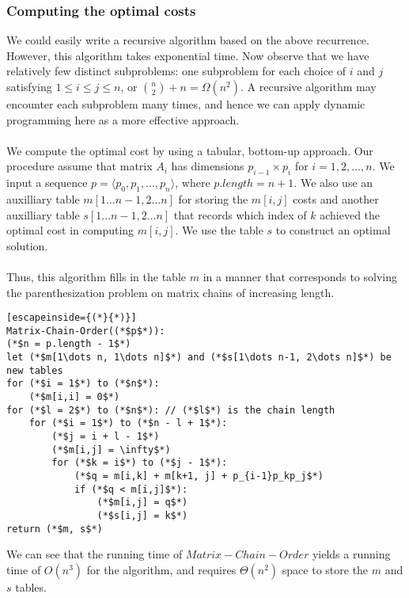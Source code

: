 \documentclass[a4paper]{article}
\begin{document}
\subsubsection{Computing the optimal costs}
We could easily write a recursive algorithm based on the above recurrence. However, this algorithm takes exponential time. Now observe that we have relatively few distinct subproblems: one subproblem for each choice of $i$ and $j$ satisfying $1\le i\le j \le n$, or ${n\choose2}+n =\Omega(n^2)$. A recursive algorithm may encounter each subproblem many times, and hence we can apply dynamic programming here as a more effective approach.\\\\
We compute the optimal cost by using a tabular, bottom-up approach. Our procedure assume that matrix $A_i$ has dimensions $p_{i-1} \times p_i$ for $i=1,2,\dots,n$. We input a sequence $p=\langle p_0,p_1,\dots,p_n\rangle$, where $p.length=n+1$. We also use an auxilliary table $m[1\dots n-1,2\dots n]$ for storing the $m[i,j]$ costs and another auxilliary table $s[1\dots n-1, 2\dots n]$ that records which index of $k$ achieved the optimal cost in computing $m[i,j]$. We use the table $s$ to construct an optimal solution.\\ \\
Thus, this algorithm fills in the table $m$ in a manner that corresponds to solving the parenthesization problem on matrix chains of increasing length.
\begin{lstlisting}[escapeinside={(*}{*)}]
Matrix-Chain-Order((*$p$*)):
(*$n = p.length - 1$*)
let (*$m[1\dots n, 1\dots n]$*) and (*$s[1\dots n-1, 2\dots n]$*) be new tables
for (*$i = 1$*) to (*$n$*):
	(*$m[i,i] = 0$*)
for (*$l = 2$*) to (*$n$*): // (*$l$*) is the chain length
	for (*$i = 1$*) to (*$n - l + 1$*):
		(*$j = i + l - 1$*)
		(*$m[i,j] = \infty$*)
		for (*$k = i$*) to (*$j - 1$*):
			(*$q = m[i,k] + m[k+1, j] + p_{i-1}p_kp_j$*)
			if (*$q < m[i,j]$*):
				(*$m[i,j] = q$*)
				(*$s[i,j] = k$*)
return (*$m, s$*)
\end{lstlisting}
We can see that the running time of $Matrix-Chain-Order$ yields a running time of $O(n^3)$ for the algorithm, and requires $\Theta(n^2)$ space to store the $m$ and $s$ tables.
\end{document}
